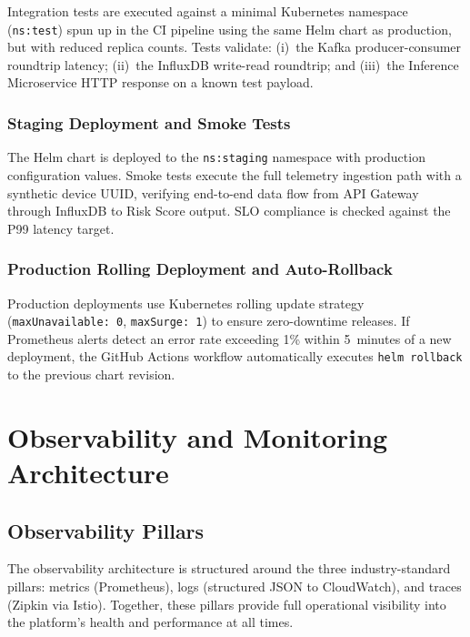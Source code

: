 \documentclass[conference]{IEEEtran}
\begin{document}
Integration tests are executed against a minimal Kubernetes namespace (\texttt{ns:test})
spun up in the CI pipeline using the same Helm chart as production, but with reduced
replica counts. Tests validate: (i)~the Kafka producer-consumer roundtrip latency;
(ii)~the InfluxDB write-read roundtrip; and (iii)~the Inference Microservice HTTP
response on a known test payload.

\subsubsection{Staging Deployment and Smoke Tests}

The Helm chart is deployed to the \texttt{ns:staging} namespace with production
configuration values. Smoke tests execute the full telemetry ingestion path with a
synthetic device UUID, verifying end-to-end data flow from API Gateway through InfluxDB
to Risk Score output. SLO compliance is checked against the P99 latency target.

\subsubsection{Production Rolling Deployment and Auto-Rollback}

Production deployments use Kubernetes rolling update strategy (\texttt{maxUnavailable:
0}, \texttt{maxSurge: 1}) to ensure zero-downtime releases. If Prometheus alerts detect
an error rate exceeding 1\% within 5~minutes of a new deployment, the GitHub Actions
workflow automatically executes \texttt{helm rollback} to the previous chart revision.

\section{Observability and Monitoring Architecture}

\subsection{Observability Pillars}

The observability architecture is structured around the three industry-standard pillars:
metrics (Prometheus), logs (structured JSON to CloudWatch), and traces (Zipkin via
Istio). Together, these pillars provide full operational visibility into the platform's
health and performance at all times.
\end{document}
